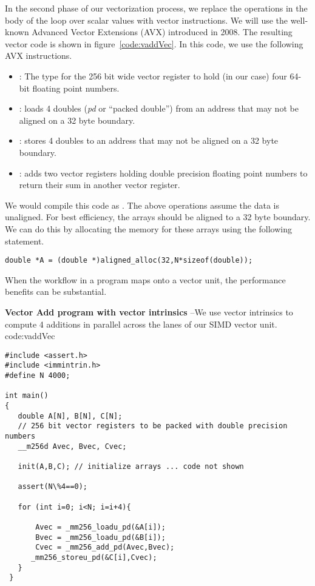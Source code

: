 In the second phase of our vectorization process, we replace the operations in the body of the loop over scalar values with vector instructions.
We will use the well-known Advanced Vector Extensions (AVX) introduced in 2008. The resulting vector code is
shown in figure~\ref{code:vaddVec}.  In this code, we use the following AVX instructions.  
\begin{itemize}
\item {}: The type for the 256 bit wide vector register to hold (in our case) four 64-bit floating point numbers.
\item {}:  loads 4 doubles (\emph{pd} or ``packed double'') from an address that may not be aligned on a 32 byte boundary.
\item {}:  stores 4 doubles to an address that may not be aligned on a 32 byte boundary.
\item {}: adds  two vector registers holding double precision floating point numbers to return 
their sum in another vector register.
\end{itemize}
We would compile this code as .  The above operations assume the data is unaligned.  
For best efficiency, the arrays  should be 
aligned to a 32 byte boundary.  We can do this by allocating the memory for these arrays using the following statement.
\begin{verbatim}
double *A = (double *)aligned_alloc(32,N*sizeof(double));
\end{verbatim}
When the workflow in a program maps onto a vector unit, the performance 
benefits can be substantial.

\begin{CodeExample}%
{\textbf{Vector Add program with vector intrinsics} --\small We use vector intrinsics to compute 
4 additions in parallel across the lanes of our SIMD vector unit. 
}%
{code:vaddVec}
\begin{lstlisting}
#include <assert.h>
#include <immintrin.h>
#define N 4000;

int main()
{
   double A[N], B[N], C[N];
   // 256 bit vector registers to be packed with double precision numbers
   __m256d Avec, Bvec, Cvec;    
     
   init(A,B,C); // initialize arrays ... code not shown
   
   assert(N\%4==0);

   for (int i=0; i<N; i=i+4){

       Avec = _mm256_loadu_pd(&A[i]);
       Bvec = _mm256_loadu_pd(&B[i]);
       Cvec = _mm256_add_pd(Avec,Bvec);
      _mm256_storeu_pd(&C[i],Cvec);
   }
 }
\end{lstlisting}
\end{CodeExample}



